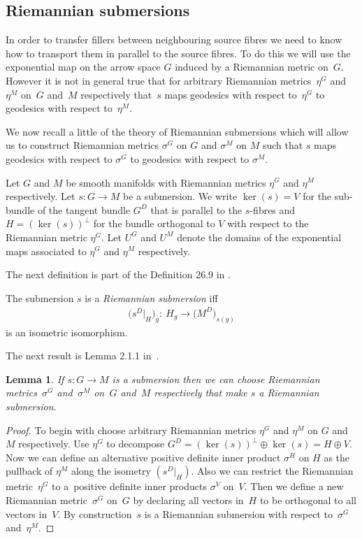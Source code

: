 \documentclass[10pt,a4paper]{amsart}
\numberwithin{equation}{section}
\newtheorem{Lemma}[Theorem]{Lemma}
\begin{document}
\subsection{Riemannian submersions}

In order to transfer f\/illers between neighbouring source f\/ibres we need to know how to transport them in parallel to the source f\/ibres. To do this we will use the exponential map on the arrow space $G$ induced by a Riemannian metric on~$G$. However it is not in general true that for arbitrary Riemannian metrics~$\eta^G$ and~$\eta^M$ on~$G$ and~$M$ respectively that~$s$ maps geodesics with respect to~$\eta^G$ to geodesics with respect to~$\eta^M$.

We now recall a little of the theory of Riemannian submersions which will allow us to construct Riemannian metrics $\sigma^G$ on $G$ and $\sigma^M$ on $M$ such that $s$ maps geodesics with respect to $\sigma^G$ to geodesics with respect to $\sigma^M$.

\begin{Notation} Let $G$ and $M$ be smooth manifolds with Riemannian metrics $\eta^G$ and $\eta^M$ respectively. Let $s\colon G\rightarrow M$ be a submersion. We write $\ker(s)=V$ for the sub-bundle of the tangent bundle $G^D$ that is parallel to the $s$-f\/ibres and $H=(\ker(s))^{\perp}$ for the bundle orthogonal to $V$ with respect to the Riemannian metric $\eta^G$. Let $U^G$ and $U^M$ denote the domains of the exponential maps associated to $\eta^G$ and $\eta^M$ respectively.
\end{Notation}

The next def\/inition is part of the Def\/inition 26.9 in \cite{Michor2008}.

\begin{Definition} The submersion $s$ is a \emph{Riemannian submersion} if\/f
\begin{gather*}\big(s^D|_H\big)_g\colon \ H_g \rightarrow \big(M^D\big)_{s(g)}\end{gather*}
is an isometric isomorphism.
\end{Definition}

The next result is Lemma 2.1.1 in~\cite{delHoyo2015}.

\begin{Lemma} If $s\colon G \rightarrow M$ is a submersion then we can choose Riemannian metrics~$\sigma^G$ and~$\sigma^M$ on~$G$ and~$M$ respectively that make $s$ a Riemannian submersion.
\end{Lemma}
\begin{proof} To begin with choose arbitrary Riemannian metrics $\eta^G$ and $\eta^M$ on $G$ and $M$ respectively. Use $\eta^G$ to decompose $G^D = (\ker(s))^{\perp}\oplus \ker(s)=H\oplus V$. Now we can def\/ine an alternative positive def\/inite inner product $\sigma^H$ on $H$ as the pullback of $\eta^M$ along the isometry $(s^D|_H)$. Also we can restrict the Riemannian metric~$\eta^G$ to a~positive def\/inite inner products $\sigma^V$ on~$V$. Then we def\/ine a new Riemannian metric~$\sigma^G$ on~$G$ by declaring all vectors in~$H$ to be orthogonal to all vectors in~$V$. By construction~$s$ is a Riemannian submersion with respect to~$\sigma^G$ and~$\eta^M$.
\end{proof}
\end{document}
